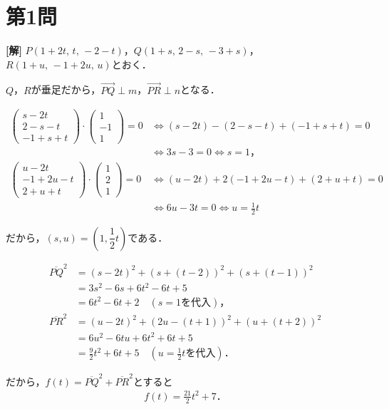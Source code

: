 \documentclass[../main.tex]{subfiles}
\begin{document}
\section*{第1問}

{\bf [解]}
$P(1+2t,\, t,\, -2-t)$，$Q(1+s,\, 2-s,\, -3+s)$，$R(1+u,\, -1+2u,\, u)$とおく．

$Q$，$R$が垂足だから，$\overrightarrow{PQ}\perp m$，$\overrightarrow{PR}\perp n$となる．

\begin{align*}
  \begin{pmatrix} s-2t \\ 2-s-t \\ -1+s+t
  \end{pmatrix}\cdot
  \begin{pmatrix}1\\-1\\1
  \end{pmatrix}=0
  &\iff (s-2t)-(2-s-t)+(-1+s+t)=0\\
  &\iff 3s-3=0 \iff s=1，\\[4pt]
  \begin{pmatrix} u-2t \\ -1+2u-t \\ 2+u+t
  \end{pmatrix}\cdot
  \begin{pmatrix}1\\2\\1
  \end{pmatrix}=0
  &\iff (u-2t)+2(-1+2u-t)+(2+u+t)=0\\
  &\iff 6u-3t=0 \iff u=\frac{1}{2}t
\end{align*}

だから，$(s,u)=\left(1,\dfrac{1}{2}t\right)$である．

\begin{align*}
  \overline{PQ}^2&=(s-2t)^2+(s+(t-2))^2+(s+(t-1))^2\\
  &=3s^2-6s+6t^2-6t+5\\
  &=6t^2-6t+2\quad(s=1\text{を代入})，\\[4pt]
  \overline{PR}^2&=(u-2t)^2+(2u-(t+1))^2+(u+(t+2))^2\\
  &=6u^2-6tu+6t^2+6t+5\\
  &=\frac{9}{2}t^2+6t+5\quad\left(u=\frac{1}{2}t\text{を代入}\right)．
\end{align*}

だから，$f(t)=\overline{PQ}^2+\overline{PR}^2$とすると
\begin{align*}
  f(t)=\frac{21}{2}t^2+7．
\end{align*}
\end{document}
